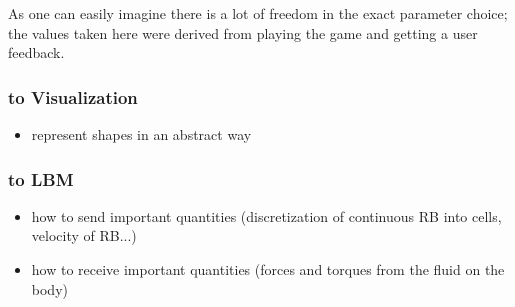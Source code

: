 As one can easily imagine there is a lot of freedom in the exact parameter choice; the values taken here were derived from playing the game and getting a user feedback.
\subsubsection{to Visualization}
\begin{itemize}
\item represent shapes in an abstract way
\end{itemize}
\subsubsection{to LBM}
\begin{itemize}
\item how to send important quantities (discretization of continuous RB into cells, velocity of RB...)
\item how to receive important quantities (forces and torques from the fluid on the body)
\end{itemize}